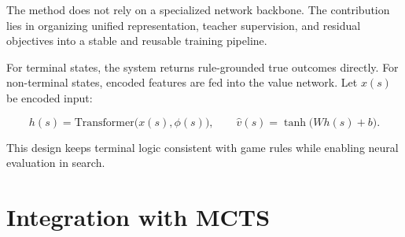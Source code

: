 The method does not rely on a specialized network backbone. The contribution lies in organizing unified representation, teacher supervision, and residual objectives into a stable and reusable training pipeline.

For terminal states, the system returns rule-grounded true outcomes directly. For non-terminal states, encoded features are fed into the value network. Let $x(s)$ be encoded input:

\begin{equation}
h(s)=\mathrm{Transformer}\bigl(x(s),\phi(s)\bigr),\qquad
\hat{v}(s)=\tanh\bigl(W h(s)+b\bigr).
\end{equation}

This design keeps terminal logic consistent with game rules while enabling neural evaluation in search.


\section{Integration with MCTS}


